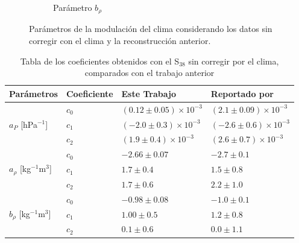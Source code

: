 \begin{figure}[H]
\begin{subfigure}[b]{\textwidth}
           \caption{Parámetro  $b_{\rho}$	 }
           \label{fig:brho_2019_S38}
           \end{subfigure}%
           \caption{Parámetros de la modulación del clima considerando los datos sin corregir con el clima y la reconstrucción anterior.}\label{fig:parameters_new_S38}
       \end{figure}
           \begin{table}[H]
               \centering
               \begin{tabular}{l|l|l|l}
                {Parámetros}						        & {Coeficiente}	    & {Este Trabajo} & Reportado por { \cite{aab2017impact}}	\\ \hline \hline
                \multirow{3}{*}{$a_P$ [hPa$^{-1}$]}  		&  $c_0$				& $ (0.12\pm0.05)\times 10^{-3}$	    & $(2.1 \pm 0.09)\times 10^{-3} $	\\ \cline{2-4} %
                                                           &  $c_1$				& $ (-2.0\pm0.3)\times 10^{-3}$		& $(-2.6  \pm 0.6)\times 10^{-3} $	\\ \cline{2-4} 
                                                           &  $c_2$				& $ (1.9\pm0.4)\times 10^{-3}$		& $(2.6   \pm 0.7)\times 10^{-3} $	\\ \hline \hline%
               
                \multirow{3}{*}{$a_\rho$ [kg$^{-1}$m$^3$]} &  $c_0$			& $-2.66   \pm 0.07$	& $ -2.7  \pm 0.1  $\\ \cline{2-4} 
                                                            &  $c_1$			& $ 1.7    \pm 0.4 $	& $ 1.5   \pm 0.8  $\\ \cline{2-4} 
                                                           &  $c_2$			& $ 1.7    \pm 0.6 $	& $ 2.2   \pm 1.0  $\\ \hline \hline %
               
               \multirow{3}{*}{$b_\rho$ [kg$^{-1}$m$^3$]} 	&  $c_0$			& $-0.98    \pm 0.08$	& $-1.0   \pm 0.1 $	\\ \cline{2-4} 
                                                           &  $c_1$			& $ 1.00    \pm 0.5$	& $ 1.2   \pm 0.8  $	\\ \cline{2-4} 
                                                           &  $c_2$			& $ 0.1    \pm 0.6$		& $ 0.0   \pm 1.1  $	\\ \hline  \hline
               
               \end{tabular}	
               \caption{Tabla de los coeficientes obtenidos con el S$_{38}$ sin corregir por el clima, comparados con el trabajo anterior} \label{tabla:cuadratica_ICRC_2019_S38}
           \end{table}

